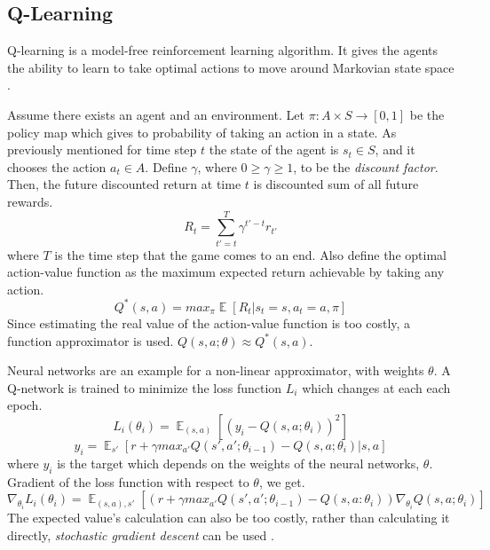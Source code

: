 \documentclass[a4paper, 12pt, conference]{IEEEtran}
\DeclareMathOperator{\Ex}{\mathbb{E}}
\begin{document}
\subsection{Q-Learning}
Q-learning is a model-free reinforcement learning algorithm. It gives the agents the ability to learn to take optimal actions to move around Markovian state space \cite{watkins1992q}.

Assume there exists an agent and an environment. Let \(\pi: A \times S \to [0,1]\) be the policy map which gives to probability of taking an action in a state. As previously mentioned for time step \(t\) the state of the agent is \(s_t\in S\), and it chooses the action \(a_t\in A\). Define \(\gamma\), where \(0\geq \gamma \geq 1\), to be the \emph{discount factor}. Then, the future discounted return at time $t$ is discounted sum of all future rewards.
\begin{equation}
    R_t=\sum ^T _{t'=t} \gamma^{t'-t}r_{t'}
\end{equation}
where \(T\) is the time step that the game comes to an end. Also define the optimal action-value function as the maximum expected return achievable by taking any action.
\begin{equation}
    Q^*(s,a)=max_{\pi} \Ex [R_t|s_t =s, a_t =a, \pi]
\end{equation}
Since estimating the real value of the action-value function is too costly, a function approximator is used. \(Q(s,a;\theta) \approx Q^*(s,a)\).

Neural networks are an example for a non-linear approximator, with weights \(\theta\). A Q-network is trained to minimize the loss function \(L_i\) which changes at each each epoch.
\begin{equation}
    L_i(\theta_i) = \Ex_{(s,a)}[(y_i-Q(s,a;\theta_i))^2]
\end{equation}
\begin{equation}
    y_i=\Ex_{s'}[r+\gamma max_{a'}Q(s',a';\theta_{i-1})-Q(s,a;\theta_i)|s,a]
\end{equation}
where \(y_i\) is the target which depends on the weights of the neural networks, \(\theta\). Gradient of the loss function with respect to \(\theta\), we get.
\begin{equation}
    \nabla_{\theta_i}L_i(\theta_i)=\Ex_{(s,a),s'}[(r+\gamma max_{a'}Q(s',a';\theta_{i-1})-Q(s,a:\theta_i))\nabla_{\theta_i} Q(s,a;\theta_i)]
\end{equation}
The expected value's calculation can also be too costly, rather than calculating it directly, \emph{stochastic gradient descent} can be used \cite{mnih2013playing}.
\end{document}

